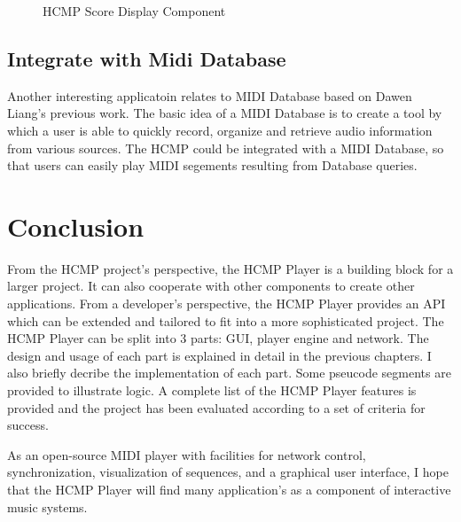 \begin{figure}[H]
\caption{HCMP Score Display Component}
\label{fig:speciation}
\end{figure}

\subsection{Integrate with Midi Database}
Another interesting applicatoin relates to MIDI Database \cite{Dawen:ISMIR2011} 
based on Dawen Liang's previous work. The basic idea of a MIDI Database 
is to create a tool by which a user is able to quickly record, organize
and retrieve audio information from various sources. The HCMP could be  
integrated with a MIDI Database, so that users can easily play MIDI 
segements resulting from  Database queries.

\section{Conclusion}
From the HCMP project's perspective, the HCMP Player is a building block for a 
larger project. It can also cooperate with other components to create other
applications. From a developer's perspective, the HCMP Player provides an API
which can be extended and tailored to fit into a more sophisticated project.
The HCMP Player can be split into 3 parts:  
GUI, player engine and network. The design and usage of each part 
is explained in detail in the previous chapters. I also briefly decribe 
the implementation of each part. Some pseucode segments are provided to 
illustrate logic. A complete list of the HCMP Player features is provided 
and the project has been evaluated according to a set of criteria for success. 

As an open-source MIDI player with facilities for network control, 
synchronization, visualization of sequences, and a graphical user interface,
I hope that the HCMP Player will find many application's as a component of 
interactive music systems.
